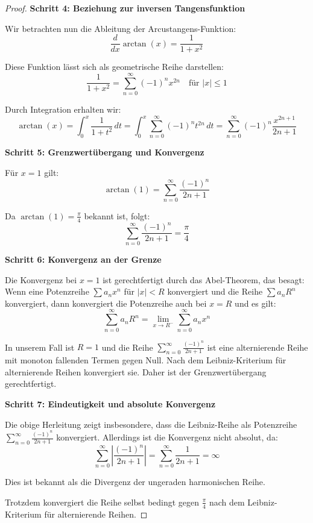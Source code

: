 \documentclass[a4paper, 12pt, twoside, openright]{report}
\theoremstyle{definition}
\theoremstyle{definition}
\begin{document}
\begin{proof}
\textbf{Schritt 4: Beziehung zur inversen Tangensfunktion}

Wir betrachten nun die Ableitung der Arcustangens-Funktion:
\begin{equation}
\frac{d}{dx} \arctan(x) = \frac{1}{1+x^2}
\end{equation}

Diese Funktion lässt sich als geometrische Reihe darstellen:
\begin{equation}
\frac{1}{1+x^2} = \sum_{n=0}^{\infty} (-1)^n x^{2n} \quad \text{für } |x| \leq 1
\end{equation}

Durch Integration erhalten wir:
\begin{equation}
\arctan(x) = \int_0^x \frac{1}{1+t^2} \, dt = \int_0^x \sum_{n=0}^{\infty} (-1)^n t^{2n} \, dt = \sum_{n=0}^{\infty} (-1)^n \frac{x^{2n+1}}{2n+1}
\end{equation}

\textbf{Schritt 5: Grenzwertübergang und Konvergenz}

Für $x = 1$ gilt:
\begin{equation}
\arctan(1) = \sum_{n=0}^{\infty} \frac{(-1)^n}{2n+1}
\end{equation}

Da $\arctan(1) = \frac{\pi}{4}$ bekannt ist, folgt:
\begin{equation}
\sum_{n=0}^{\infty} \frac{(-1)^n}{2n+1} = \frac{\pi}{4}
\end{equation}

\textbf{Schritt 6: Konvergenz an der Grenze}

Die Konvergenz bei $x = 1$ ist gerechtfertigt durch das Abel-Theorem, das besagt: Wenn eine Potenzreihe $\sum a_n x^n$ für $|x| < R$ konvergiert und die Reihe $\sum a_n R^n$ konvergiert, dann konvergiert die Potenzreihe auch bei $x = R$ und es gilt:
\begin{equation}
\sum_{n=0}^{\infty} a_n R^n = \lim_{x \to R^-} \sum_{n=0}^{\infty} a_n x^n
\end{equation}

In unserem Fall ist $R = 1$ und die Reihe $\sum_{n=0}^{\infty} \frac{(-1)^n}{2n+1}$ ist eine alternierende Reihe mit monoton fallenden Termen gegen Null. Nach dem Leibniz-Kriterium für alternierende Reihen konvergiert sie. Daher ist der Grenzwertübergang gerechtfertigt.

\textbf{Schritt 7: Eindeutigkeit und absolute Konvergenz}

Die obige Herleitung zeigt insbesondere, dass die Leibniz-Reihe als Potenzreihe $\sum_{n=0}^{\infty} \frac{(-1)^n}{2n+1}$ konvergiert. Allerdings ist die Konvergenz nicht absolut, da:
\begin{equation}
\sum_{n=0}^{\infty} \left|\frac{(-1)^n}{2n+1}\right| = \sum_{n=0}^{\infty} \frac{1}{2n+1} = \infty
\end{equation}

Dies ist bekannt als die Divergenz der ungeraden harmonischen Reihe.

Trotzdem konvergiert die Reihe selbst bedingt gegen $\frac{\pi}{4}$ nach dem Leibniz-Kriterium für alternierende Reihen.
\end{proof}
\end{document}
